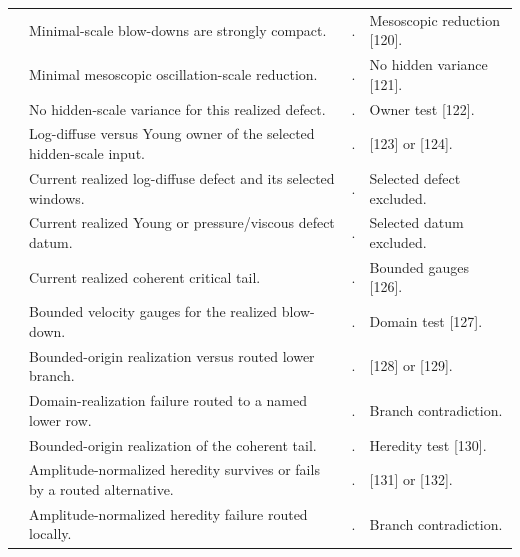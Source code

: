 \documentclass[11pt]{amsart}
\numberwithin{equation}{section}
\theoremstyle{plain}
\theoremstyle{definition}
\theoremstyle{remark}
\begin{document}
\begin{longtable}{@{}L{0.06\textwidth}L{0.25\textwidth}L{0.40\textwidth}L{0.21\textwidth}@{}}
\relax
[119] & Minimal-scale blow-downs are strongly compact. &
. & Mesoscopic reduction [120].\\
\relax
[120] & Minimal mesoscopic oscillation-scale reduction. &
. & No hidden variance [121].\\
\relax
[121] & No hidden-scale variance for this realized defect. &
. & Owner test [122].\\
\relax
[122] & Log-diffuse versus Young owner of the selected hidden-scale input. &
. & [123] or [124].\\
\relax
[123] & Current realized log-diffuse defect and its selected windows. &
. &
Selected defect excluded.\\
\relax
[124] & Current realized Young or pressure/viscous defect datum. &
. &
Selected datum excluded.\\
\relax
[125] & Current realized coherent critical tail. &
. & Bounded gauges [126].\\
\relax
[126] & Bounded velocity gauges for the realized blow-down. &
. & Domain test [127].\\
\relax
[127] & Bounded-origin realization versus routed lower branch. &
. & [128] or [129].\\
\relax
[128] & Domain-realization failure routed to a named lower row. &
. & Branch contradiction.\\
\relax
[129] & Bounded-origin realization of the coherent tail. &
. & Heredity test [130].\\
\relax
[130] & Amplitude-normalized heredity survives or fails by a routed alternative. &
. & [131] or [132].\\
\relax
[131] & Amplitude-normalized heredity failure routed locally. &
. & Branch contradiction.\\

\end{longtable}
\end{document}
